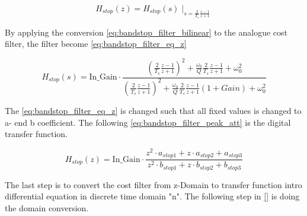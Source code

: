 \begin{equation}\label{eq:bandstop_filter_bilinear}
H_{stop}(z) = H_{stop}(s) \mid_{s=\frac{2}{T_s}\frac{z-1}{z+1}} 
\end{equation}

    \startexplain
    \stopexplain

By applying the conversion \autoref{eq:bandstop_filter_bilinear} to the analogue cost filter, the filter become \autoref{eq:bandstop_filter_eq_z}

\begin{equation}\label{eq:bandstop_filter_eq_z}
H_{stop}(s) = \text{In_Gain} \cdot \frac{(\frac{2}{T_s}\frac{z-1}{z+1})^2+\frac{\omega_0}{Q}\frac{2}{T_s}\frac{z-1}{z+1}+\omega_0^2}{(\frac{2}{T_s}\frac{z-1}{z+1})^2+\frac{\omega_0}{Q}\frac{2}{T_s}\frac{z-1}{z+1}(1+Gain)+\omega_0^2}
\end{equation}

The \autoref{eq:bandstop_filter_eq_z} is changed such that all fixed values is changed to a- end b coefficient. The following \autoref{eq:bandstop_filter_peak_att} is the digital transfer function.


\begin{equation}\label{eq:bandstop_filter_peak_att}
        H_{stop}(z) =  \text{In_Gain} \cdot \frac{z^2 \cdot a_{stop1} + z \cdot a_{stop2} + a_{stop3}}{z^2 \cdot b_{stop1} + z \cdot b_{stop2} + b_{stop3}}
    \end{equation}
    
    \startexplain
    \stopexplain

The last step is to convert the cost filter from z-Domain to transfer function intro differential equation in discrete time domain "n". The following step in \autoref{} is doing the domain conversion.



